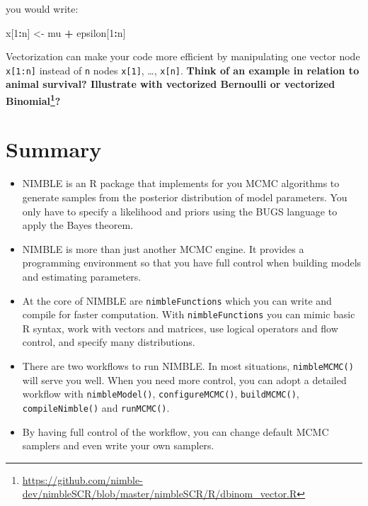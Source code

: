 \documentclass[
  12pt,
]{krantz}
\newenvironment{Shaded}{\begin{snugshade}}{\end{snugshade}}
\newcommand{\DecValTok}[1]{\textcolor[rgb]{0.00,0.00,0.81}{#1}}
\newcommand{\NormalTok}[1]{#1}
\newcommand{\OtherTok}[1]{\textcolor[rgb]{0.56,0.35,0.01}{#1}}
\newcommand{\SpecialCharTok}[1]{\textcolor[rgb]{0.81,0.36,0.00}{\textbf{#1}}}
\renewcommand{\href}[2]{#2\footnote{\url{#1}}}
\begin{document}
you would write:

\begin{Shaded}
\begin{Highlighting}[]
\NormalTok{x[}\DecValTok{1}\SpecialCharTok{:}\NormalTok{n] }\OtherTok{\textless{}{-}}\NormalTok{ mu }\SpecialCharTok{+}\NormalTok{ epsilon[}\DecValTok{1}\SpecialCharTok{:}\NormalTok{n]}
\end{Highlighting}
\end{Shaded}

Vectorization can make your code more efficient by manipulating one vector node \texttt{x{[}1:n{]}} instead of \texttt{n} nodes \texttt{x{[}1{]}}, \ldots, \texttt{x{[}n{]}}. \textbf{Think of an example in relation to animal survival? Illustrate with vectorized Bernoulli or \href{https://github.com/nimble-dev/nimbleSCR/blob/master/nimbleSCR/R/dbinom_vector.R}{vectorized Binomial}?}

\hypertarget{summary-1}{%
\section{Summary}\label{summary-1}}

\begin{itemize}
\item
  NIMBLE is an R package that implements for you MCMC algorithms to generate samples from the posterior distribution of model parameters. You only have to specify a likelihood and priors using the BUGS language to apply the Bayes theorem.
\item
  NIMBLE is more than just another MCMC engine. It provides a programming environment so that you have full control when building models and estimating parameters.
\item
  At the core of NIMBLE are \texttt{nimbleFunctions} which you can write and compile for faster computation. With \texttt{nimbleFunctions} you can mimic basic R syntax, work with vectors and matrices, use logical operators and flow control, and specify many distributions.
\item
  There are two workflows to run NIMBLE. In most situations, \texttt{nimbleMCMC()} will serve you well. When you need more control, you can adopt a detailed workflow with \texttt{nimbleModel()}, \texttt{configureMCMC()}, \texttt{buildMCMC()}, \texttt{compileNimble()} and \texttt{runMCMC()}.
\item
  By having full control of the workflow, you can change default MCMC samplers and even write your own samplers.
\end{itemize}
\end{document}
